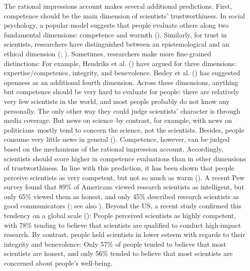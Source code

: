 \documentclass[
  jou,
  floatsintext,
  longtable,
  nolmodern,
  notxfonts,
  notimes,
  colorlinks=true,linkcolor=blue,citecolor=blue,urlcolor=blue]{apa7}
\begin{document}
The rational impressions account makes several additional predictions.
First, competence should be the main dimension of scientists'
trustworthiness. In social psychology, a popular model suggests that
people evaluate others along two fundamental dimensions: competence and
warmth (). Similarly, for trust in scientists, researchers have
distinguished between an epistemological and an ethical dimension
(;
).
Sometimes, researchers make more fine-grained distinctions: For example,
Hendriks et al.
() have argued
for three dimensions: expertise/competence, integrity, and benevolence.
Besley et al. ()
has suggested openness as an additional fourth dimension. Across these
dimensions, anything but competence should be very hard to evaluate for
people: there are relatively very few scientists in the world, and most
people probably do not know any personally. The only other way they
could judge scientists' character is through media coverage. But news on
science--by contrast, for example, with news on politicians--mostly tend
to concern the science, not the scientists. Besides, people consume very
little news in general
().
Competence, however, can be judged based on the mechanisms of the
rational impression account. Accordingly, scientists should score higher
in competence evaluations than in other dimensions of trustworthiness.
In line with this prediction, it has been shown that people perceive
scientists as very competent, but not so much as warm
(). A
recent Pew survey found that 89\% of Americans viewed research
scientists as intelligent, but only 65\% viewed them as honest, and only
45\% described research scientists as good communicators
(; see also ). Beyond the US, a recent study confirmed this tendency on
a global scale (): People perceived scientists as highly competent, with
78\% tending to believe that scientists are qualified to conduct
high-impact research. By contrast, people held scientists in lower
esteem with regards to their integrity and benevolence: Only 57\% of
people tended to believe that most scientists are honest, and only 56\%
tended to believe that most scientists are concerned about people's
well-being.
\end{document}
